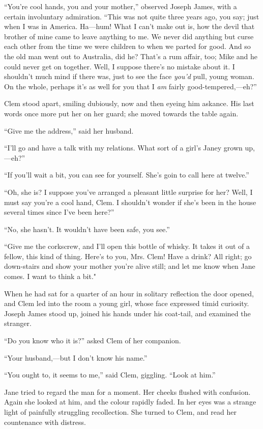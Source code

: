 ``You're cool hands, you and your mother,'' observed Joseph James, with
a certain involuntary admiration. ``This was not quite three years ago,
you say; just when I was in America. Ha---hum! What I can't make out is,
how the devil that brother of mine came to leave anything to me. We
never did anything but curse each other from the time we were children
to when we parted for good. And so the old man went out to Australia,
did he? That's a rum affair, too; Mike and he could never get on
together. Well, I suppose there's no mistake about it. I {}shouldn't
much mind if there was, just to see the face \emph{you'd} pull, young
woman. On the whole, perhaps it's as well for you that I \emph{am}
fairly good-tempered,---eh?''

Clem stood apart, smiling dubiously, now and then eyeing him askance.
His last words once more put her on her guard; she moved towards the
table again.

``Give me the address,'' said her husband.

``I'll go and have a talk with my relations. What sort of a girl's Janey
grown up,---eh?''

``If you'll wait a bit, you can see for yourself. She's goin to call
here at twelve.''

``Oh, she is? I suppose you've arranged a pleasant little surprise for
her? Well, I must say you're a cool hand, Clem. I shouldn't wonder if
she's been in the house several times since I've been here?''

``No, she hasn't. It wouldn't have been safe, you see.''

``Give me the corkscrew, and I'll open this bottle of whisky. It takes
it out of a fellow, this kind of thing. Here's to you, Mrs. Clem! Have a
drink? All right; go {}down-stairs and show your mother you're alive
still; and let me know when Jane comes. I want to think a bit."

When he had sat for a quarter of an hour in solitary reflection the door
opened, and Clem led into the room a young girl, whose face expressed
timid curiosity. Joseph James stood up, joined his hands under his
coat-tail, and examined the stranger.

``Do you know who it is?'' asked Clem of her companion.

``Your husband,---but I don't know his name.''

``You ought to, it seems to me,'' said Clem, giggling. ``Look at him.''

Jane tried to regard the man for a moment. Her cheeks flushed with
confusion. Again she looked at him, and the colour rapidly faded. In her
eyes was a strange light of painfully struggling recollection. She
turned to Clem, and read her countenance with distress.

